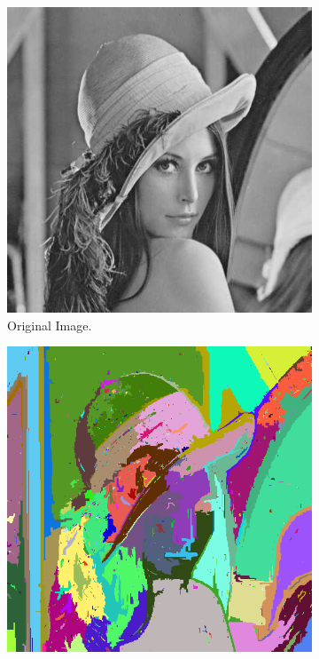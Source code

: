 \documentclass{sbc2023}
\begin{document}
    \begin{figure}[H]
    \centering
        \begin{subfigure}[b]{0.16\textwidth}
            \includegraphics[width=\textwidth]{imgs/lennaGray.png}
            \caption{Original Image.}
            \label{fig:lenna_original_exp} %
        \end{subfigure}
    \hfill
        \begin{subfigure}[b]{0.15\textwidth}
            \includegraphics[width=\textwidth]{imgs/lennaGray_felzenszwalb.png}

\end{subfigure}
\end{figure}
\end{document}

